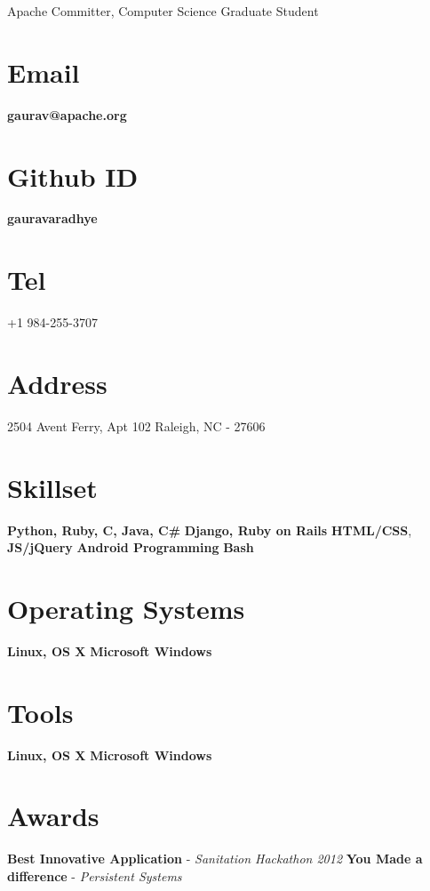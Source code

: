 \documentclass[]{friggeri-cv}
\begin{document}
      {Apache Committer, Computer Science Graduate Student}
      
\noindent\hspace{-0.16\textwidth}\makebox[\linewidth]{\rule{19.5cm}{0.4pt}}

\begin{aside}
\vspace{30 mm} \leavevmode
  \section{Email}
    \textbf{gaurav@apache.org}
    ~
  \section{Github ID}
    \textbf{gauravaradhye}
    ~
  \section{Tel}
    +1 984-255-3707
    ~
  \section{Address}
    2504 Avent Ferry, Apt 102
    Raleigh, NC - 27606
    ~
  \section{Skillset}
        \textbf{Python, Ruby, C, Java, C\#}
        \textbf{Django, Ruby on Rails}
        \textbf{HTML/CSS}, \textbf{JS/jQuery}
        \textbf{Android Programming}
        \textbf{Bash}
~
  \section{Operating Systems}
        \textbf{Linux, OS X}\leavevmode
        \textbf{Microsoft Windows}
~
  \section{Tools}
        \textbf{Linux, OS X}\leavevmode
        \textbf{Microsoft Windows}
~
  \section{Awards}
        \textbf{Best Innovative Application} -
        \emph{Sanitation Hackathon 2012}
        \vspace{1mm} \leavevmode
        \textbf{You Made a difference} -
        \emph{Persistent Systems}
~
\end{aside}
\end{document}

